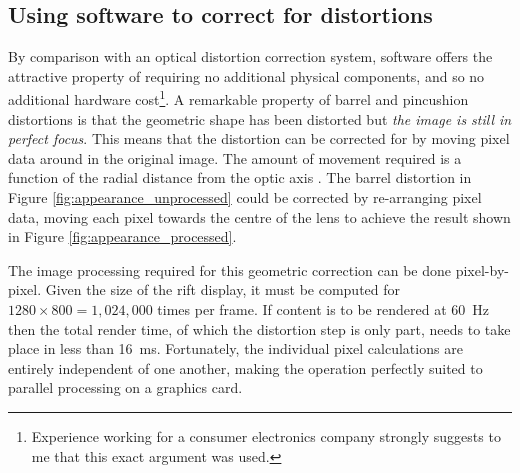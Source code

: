 \documentclass[MSc,paper=a4,pagesize=auto]{icldt}
\begin{document}
\subsection{Using software to correct for distortions}
By comparison with an optical distortion correction system, software offers the attractive property of requiring no additional physical components, and so no additional hardware cost\footnote{Experience working for a consumer electronics company strongly suggests to me that this exact argument was used.}. A remarkable property of barrel and pincushion distortions is that the geometric shape has been distorted but \textit{the image is still in perfect focus}. This means that the distortion can be corrected for by moving pixel data around in the original image. The amount of movement required is a function of the radial distance from the optic axis \cite{Brunelli2009}. The barrel distortion in Figure \ref{fig:appearance_unprocessed} could be corrected by re-arranging pixel data, moving each pixel towards the centre of the lens to achieve the result shown in Figure \ref{fig:appearance_processed}.

The image processing required for this geometric correction can be done pixel-by-pixel. Given the size of the rift display, it must be computed for $1280 \times 800 = 1,024,000$ times per frame. If content is to be rendered at \SI{60}{Hz} then the total render time, of which the distortion step is only part, needs to take place in less than \SI{16}{ms}. Fortunately, the individual pixel calculations are entirely independent of one another, making the operation perfectly suited to parallel processing on a graphics card. 
\end{document}
